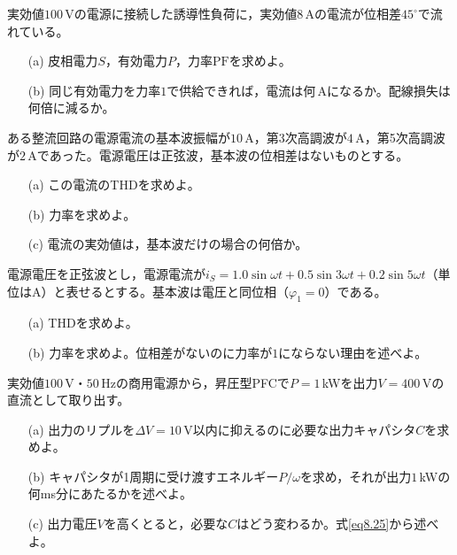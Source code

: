 \begin{章末問題}
\item \label{ex8.6}実効値$100$\,Vの電源に接続した誘導性負荷に，実効値$8$\,Aの電流が位相差$45^\circ$で流れている。
\begin{enumerate}
\item[(a)] 皮相電力$S$，有効電力$P$，力率$\mathrm{PF}$を求めよ。
\item[(b)] 同じ有効電力を力率$1$で供給できれば，電流は何\,Aになるか。配線損失は何倍に減るか。
\end{enumerate}

\item \label{ex8.7}ある整流回路の電源電流の基本波振幅が$10$\,A，第3次高調波が$4$\,A，第5次高調波が$2$\,Aであった。電源電圧は正弦波，基本波の位相差はないものとする。
\begin{enumerate}
\item[(a)] この電流のTHDを求めよ。
\item[(b)] 力率を求めよ。
\item[(c)] 電流の実効値は，基本波だけの場合の何倍か。
\end{enumerate}

\item \label{ex8.8}電源電圧を正弦波とし，電源電流が$i_S = 1.0\sin\omega t + 0.5\sin3\omega t + 0.2\sin5\omega t$（単位はA）と表せるとする。基本波は電圧と同位相（$\varphi_1 = 0$）である。
\begin{enumerate}
\item[(a)] THDを求めよ。
\item[(b)] 力率を求めよ。位相差がないのに力率が$1$にならない理由を述べよ。
\end{enumerate}

\item \label{ex8.9}実効値$100$\,V・$50$\,Hzの商用電源から，昇圧型PFCで$P = 1$\,kWを出力$V = 400$\,Vの直流として取り出す。
\begin{enumerate}
\item[(a)] 出力のリプルを$\mathit{\Delta}V = 10$\,V以内に抑えるのに必要な出力キャパシタ$C$を求めよ。
\item[(b)] キャパシタが1周期に受け渡すエネルギー$P/\omega$を求め，それが出力$1$\,kWの何ms分にあたるかを述べよ。
\item[(c)] 出力電圧$V$を高くとると，必要な$C$はどう変わるか。式\ref{eq8.25}から述べよ。
\end{enumerate}


\end{章末問題}
